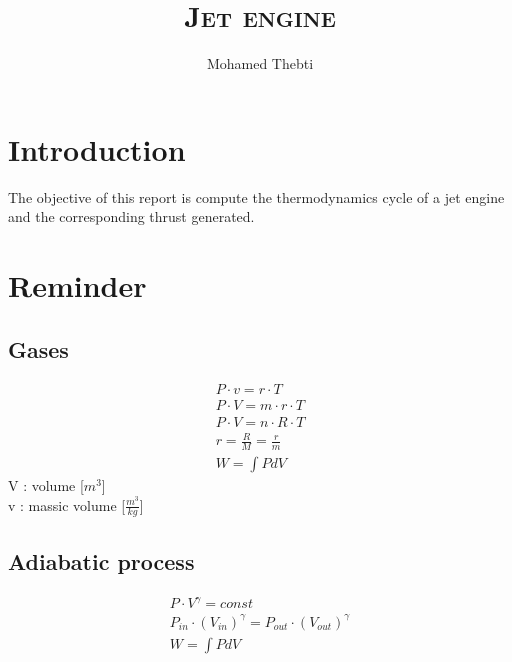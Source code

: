 \documentclass[12pt,a4paper]{article}
\title{
	\Huge\textsc{Jet engine}
}
\author{Mohamed Thebti}
\begin{document}
	\setlength{\parindent}{0mm}
	
	\fancyhead[R]{\slshape \leftmark}
	
	\fancyfoot[C]{}
	\fancyfoot[R]{\thepage}
	
	\maketitle
	\newpage
	
	\tableofcontents
	
	\newpage
	
	
	
	\section{Introduction}
	
	The objective of this report is compute the thermodynamics cycle of a jet engine and the corresponding thrust generated. 
	
	
	\section{Reminder}
	\subsection{Gases}
		\begin{eqnarray}
		P \cdot v= r \cdot T\\
		P \cdot V= m \cdot r \cdot T\\
		P \cdot V= n \cdot R \cdot T\\
		r = \frac{R}{M} = \frac{r}{m}\\
		W =\int P dV
	\end{eqnarray}
	V : volume [$m^3$] \\
	v : massic volume [$\frac{m^3}{kg}$]
	\subsection{Adiabatic process}

	\begin{eqnarray}
		P \cdot V^{\gamma} = const\\
		P_{in} \cdot (V_{in})^{\gamma} = P_{out} \cdot (V_{out})^{\gamma}\\
		W =\int P dV
	\end{eqnarray}
	
\end{document}
